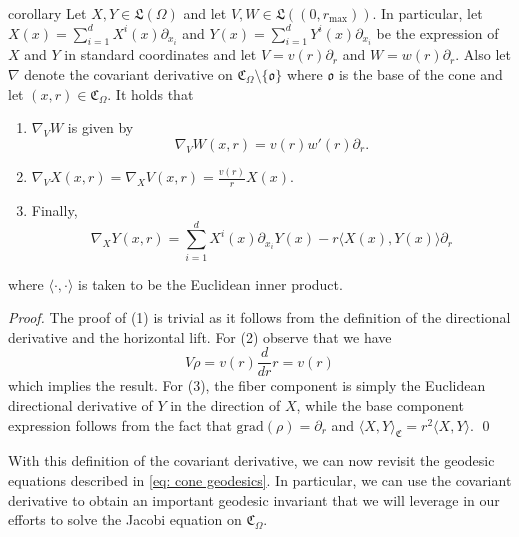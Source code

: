 \documentclass[11pt]{article}
\begin{document}
\begin{restatable}{corollary}{} \label{corollary: connection on cone}
    Let $X, Y \in \mathfrak{L}(\Omega)$ and let $V, W \in \mathfrak{L}((0, r_{\max}))$. In particular, let $X(x) = \sum_{i = 1}^d X^i(x)\partial_{x_i}$ and $Y(x) = \sum_{i = 1}^d Y^i(x)\partial_{x_i}$ be the expression of $X$ and $Y$ in standard coordinates and let $V = v(r)\partial_r$ and $W = w(r)\partial_r$. Also let $\nabla$ denote the covariant derivative on $\mathfrak{C}_\Omega \setminus \{\mathfrak{o}\}$ where $\mathfrak{o}$ is the base of the cone and let $(x,r) \in \mathfrak{C}_\Omega$. It holds that 
    \begin{enumerate}
        \item $\nabla_VW$ is given by 
        \[\nabla_VW(x,r) = v(r)w'(r)\partial_r.\]
        \item $\nabla_VX(x,r) = \nabla_XV(x,r) = \frac{v(r)}{r}X(x)$.
        \item Finally,
        \[\nabla_XY(x,r) = \sum_{i = 1}^dX^i(x) \partial_{x_i}Y(x)  - r\langle X(x), Y(x) \rangle\partial_r \]
    \end{enumerate}
    where $\langle\cdot, \cdot\rangle$ is taken to be the Euclidean inner product. 
\end{restatable}
\noindent \textit{Proof.} The proof of (1) is trivial as it follows from the definition of the directional derivative and the horizontal lift. For (2) observe that we have
\[V\rho = v(r)\frac{d}{d r}r = v(r)\]
which implies the result. For (3), the fiber component is simply the Euclidean directional derivative of $Y$ in the direction of $X$, while the base component expression follows from the fact that $\text{grad}(\rho) = \partial_r$ and $\langle X, Y \rangle_{\mathfrak{C}} = r^2\langle X, Y\rangle$.  \qed{}

With this definition of the covariant derivative, we can now revisit the geodesic equations described in \cref{eq: cone geodesics}. In particular, we can use the covariant derivative to obtain an important geodesic invariant that we will leverage in our efforts to solve the Jacobi equation on $\mathfrak{C}_\Omega$. 
\end{document}
